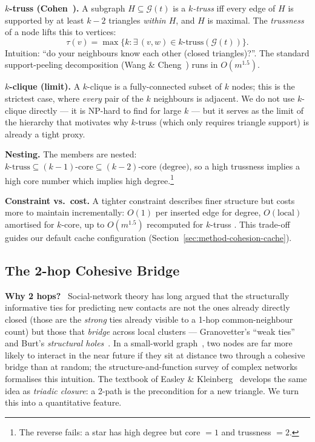 \documentclass[sigconf,nonacm,review]{acmart}
\newcommand{\Gcal}{\mathcal{G}}
\begin{document}
\medskip
\noindent\textbf{$k$-truss (Cohen~\cite{cohen2008trusses}).} A subgraph
$H\subseteq\Gcal(t)$ is a \emph{$k$-truss} iff every edge of $H$ is supported
by at least $k-2$ triangles \emph{within $H$}, and $H$ is maximal. The
\emph{trussness} of a node lifts this to vertices:
\begin{equation}
\tau(v)=\max\{k:\exists\,(v,w)\in k\text{-truss}(\Gcal(t))\}.
\end{equation}
Intuition: ``do your neighbours know each other (closed triangles)?''. The
standard support-peeling decomposition (Wang \& Cheng~\cite{wang2012truss}) runs in $O(m^{1.5})$.

\medskip
\noindent\textbf{$k$-clique (limit).} A $k$-clique is a fully-connected
subset of $k$ nodes; this is the strictest case, where \emph{every} pair of
the $k$ neighbours is adjacent. We do not use $k$-clique directly --- it is
NP-hard to find for large $k$ --- but it serves as the limit of the
hierarchy that motivates why $k$-truss (which only requires triangle
support) is already a tight proxy.

\medskip
\noindent\textbf{Nesting.} The members are nested:
$k\text{-truss}\subseteq(k-1)\text{-core}\subseteq(k-2)\text{-core (degree)}$,
so a high trussness implies a high core number which implies high
degree.\footnote{The reverse fails: a star has high degree but core $=1$
and trussness $=2$.}

\medskip
\noindent\textbf{Constraint vs.\ cost.} A tighter constraint describes finer
structure but costs more to maintain incrementally:
$O(1)$ per inserted edge for degree, $O(\text{local})$ amortised for
$k$-core, up to $O(m^{1.5})$ recomputed for $k$-truss
\cite{batagelj2003cores,cohen2008trusses,wang2012truss}. This trade-off
guides our default cache configuration (Section~\ref{sec:method-cohesion-cache}).

\subsection{The 2-hop Cohesive Bridge}
\label{sec:2hop}
\noindent\textbf{Why 2 hops?} \ Social-network theory has long argued that
the structurally informative ties for predicting new contacts are not the
ones already directly closed (those are the \emph{strong} ties already
visible to a 1-hop common-neighbour count) but those that \emph{bridge}
across local clusters --- Granovetter's ``weak
ties''~\cite{granovetter1973weakties} and Burt's
\emph{structural holes}~\cite{burt1992structuralholes}. In a small-world
graph~\cite{watts1998smallworld}, two nodes are far more likely to interact
in the near future if they sit at distance two through a cohesive bridge
than at random; the structure-and-function survey of complex
networks~\cite{newman2003survey} formalises this intuition.
The textbook of Easley \& Kleinberg~\cite{easley2010networks} develops the
same idea as \emph{triadic closure}: a 2-path is the precondition for a
new triangle. We turn this into a quantitative feature.
\end{document}
